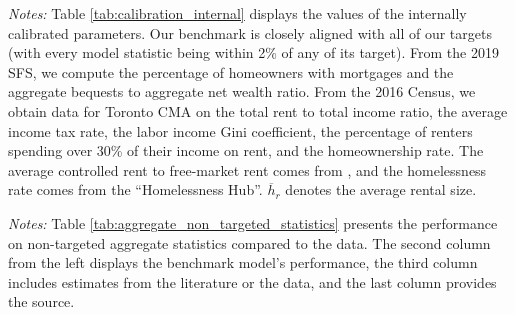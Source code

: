 \documentclass[parskip=full]{article}
\newenvironment{fignote2}[1]
{
\par
\medskip
\begin{minipage}{#1}
\footnotesize
}
{
\end{minipage}
}
\begin{document}
\begin{table}[H]
    \centering
    \caption{Internally assigned parameter values}
    \vspace{-0.5cm}
    \label{tab:calibration_internal}
    
    \vspace{-0.45cm}
    \begin{fignote2}{0.87\textwidth}
    \textit{Notes:} Table \ref{tab:calibration_internal} displays the values of the internally calibrated parameters. Our benchmark is closely aligned with all of our targets (with every model statistic being within 2\% of any of its target). From the 2019 SFS, we compute the percentage of homeowners with mortgages and the aggregate bequests to aggregate net wealth ratio. From the 2016 Census, we obtain data for Toronto CMA on the total rent to total income ratio, the average income tax rate, the labor income Gini coefficient, the percentage of renters spending over 30\% of their income on rent, and the homeownership rate. The average controlled rent to free-market rent comes from \citet{zhang-gou}, and the homelessness rate comes from the ``Homelessness Hub''. $\overline{h}_{r}$ denotes the average rental size.
    \end{fignote2}
\end{table}

\begin{table}[H]
    \centering
    \caption{Aggregate non-targeted statistics}
    \vspace{-0.5cm}
    \label{tab:aggregate_non_targeted_statistics}  
    \vspace{-0.45cm}
    \begin{fignote2}{0.84\textwidth}
      \textit{Notes:} Table \ref{tab:aggregate_non_targeted_statistics} presents the performance on non-targeted aggregate statistics compared to the data. The second column from the left displays the benchmark model's performance, the third column includes estimates from the literature or the data, and the last column provides the source.
    \end{fignote2}
\end{table}
\end{document}
